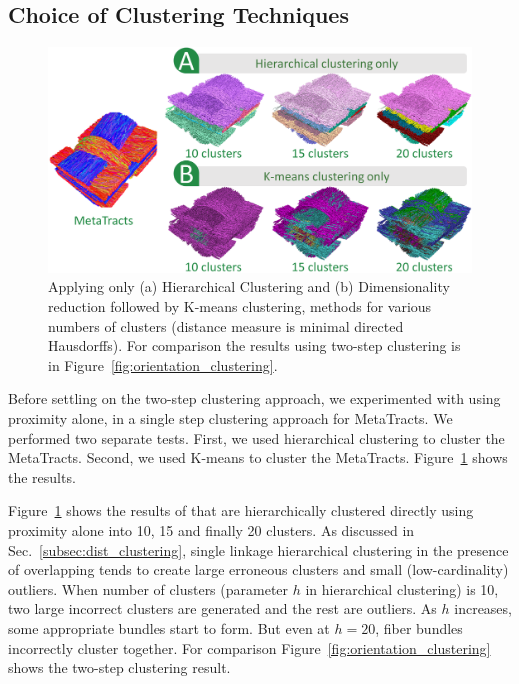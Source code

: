 \subsection{Choice of Clustering Techniques}\label{subsec:clus_choice}
\begin{figure}[t]
	\centering
	\includegraphics[width=\linewidth]{images/comparison_all.eps}
	\caption{Applying only (a) Hierarchical Clustering and (b) Dimensionality reduction followed by K-means clustering, methods for various numbers of clusters (distance measure is minimal directed Hausdorffs).
		For comparison the results using two-step clustering is in Figure~\ref{fig:orientation_clustering}.}
	\label{fig:comparison}
\end{figure} 
Before settling on the two-step clustering approach, we experimented with using proximity alone, in a single step clustering approach for MetaTracts. We performed two separate tests. First, we used hierarchical clustering to cluster the MetaTracts. Second, we used K-means to cluster the MetaTracts.
Figure~\ref{fig:comparison} shows the results.


Figure~\ref{fig:comparison} shows the results of \mt that are hierarchically clustered directly using proximity alone into 10, 15 and finally 20 clusters. 
As discussed in Sec.~\ref{subsec:dist_clustering}, single linkage hierarchical clustering in the presence of overlapping \mt tends to create large erroneous clusters and small (low-cardinality) outliers.
When number of clusters (parameter $h$ in hierarchical clustering) is 10, two large incorrect clusters are generated and the rest are outliers. As $h$ increases, some appropriate bundles start to form. But even at $h=20$, fiber bundles incorrectly cluster together. For comparison Figure~\ref{fig:orientation_clustering} shows the two-step clustering result. 


